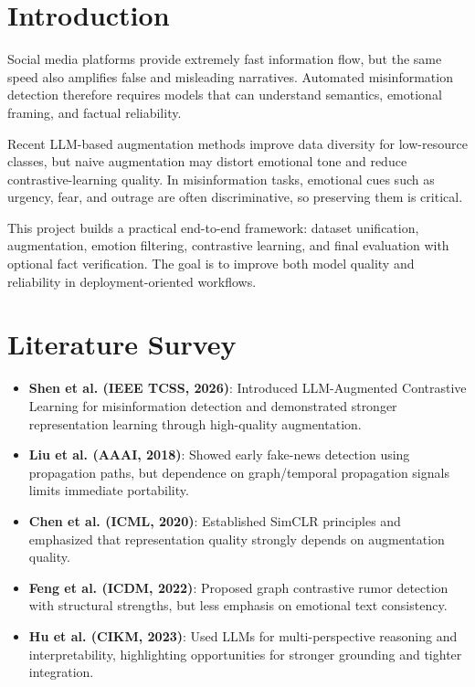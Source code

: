 \documentclass[12pt,a4paper]{report}
\begin{document}
\chapter{Introduction}
Social media platforms provide extremely fast information flow, but the same speed also amplifies false and misleading narratives. Automated misinformation detection therefore requires models that can understand semantics, emotional framing, and factual reliability.

Recent LLM-based augmentation methods improve data diversity for low-resource classes, but naive augmentation may distort emotional tone and reduce contrastive-learning quality. In misinformation tasks, emotional cues such as urgency, fear, and outrage are often discriminative, so preserving them is critical.

This project builds a practical end-to-end framework: dataset unification, augmentation, emotion filtering, contrastive learning, and final evaluation with optional fact verification. The goal is to improve both model quality and reliability in deployment-oriented workflows.

\chapter{Literature Survey}
\begin{itemize}
\item \textbf{Shen et al. (IEEE TCSS, 2026)}: Introduced LLM-Augmented Contrastive Learning for misinformation detection and demonstrated stronger representation learning through high-quality augmentation.
\item \textbf{Liu et al. (AAAI, 2018)}: Showed early fake-news detection using propagation paths, but dependence on graph/temporal propagation signals limits immediate portability.
\item \textbf{Chen et al. (ICML, 2020)}: Established SimCLR principles and emphasized that representation quality strongly depends on augmentation quality.
\item \textbf{Feng et al. (ICDM, 2022)}: Proposed graph contrastive rumor detection with structural strengths, but less emphasis on emotional text consistency.
\item \textbf{Hu et al. (CIKM, 2023)}: Used LLMs for multi-perspective reasoning and interpretability, highlighting opportunities for stronger grounding and tighter integration.
\end{itemize}
\end{document}
